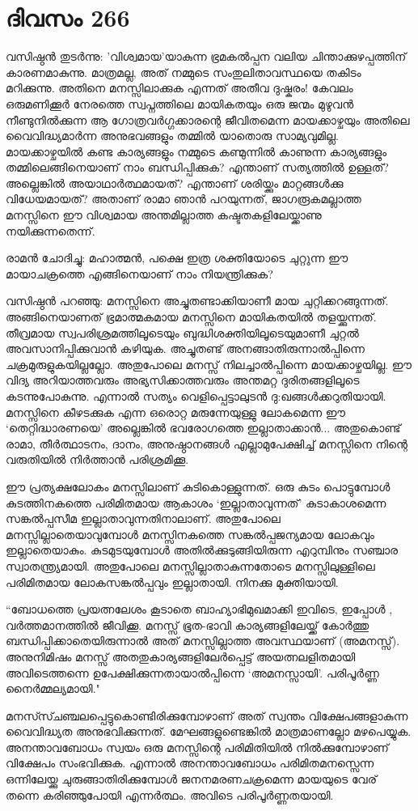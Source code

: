 \section{ദിവസം 266}


വസിഷ്ഠന്‍ തുടര്‍ന്നു: 'വിശ്വമായ'യാകുന്ന ഭ്രമകല്‍പ്പന വലിയ ചിന്താക്കുഴപ്പത്തിന് കാരണമാകുന്നു. മാത്രമല്ല, അത് നമ്മുടെ സംതുലിതാവസ്ഥയെ തകിടം മറിക്കുന്നു. അതിനെ മനസ്സിലാക്കുക എന്നത് അതീവ ദുഷ്കരം! കേവലം ഒരുമണിക്കൂര്‍ നേരത്തെ സ്വപ്നത്തിലെ മായികതയും ഒരു ജന്മം മുഴുവന്‍ നീണ്ടുനില്‍ക്കുന്ന ആ ഗോത്രവര്‍ഗ്ഗക്കാരന്റെ ജീവിതമെന്ന മായക്കാഴ്ചയും അതിലെ വൈവിദ്ധ്യമാര്‍ന്ന അനുഭവങ്ങളും തമ്മില്‍ യാതൊരു സാമ്യവുമില്ല. മായക്കാഴ്ചയില്‍ കണ്ട കാര്യങ്ങളും നമ്മുടെ കണ്മുന്നില്‍ കാണുന്ന കാര്യങ്ങളും തമ്മിലെങ്ങിനെയാണ് നാം ബന്ധിപ്പിക്കുക? എന്താണ് സത്യത്തില്‍ ഉള്ളത്? അല്ലെങ്കില്‍ അയാഥാര്‍ത്ഥമായത്? എന്താണ് ശരിയ്ക്കും  മാറ്റങ്ങള്‍ക്കു വിധേയമായത്? അതാണ്‌ രാമാ ഞാന്‍ പറയുന്നത്, ജാഗരൂകമല്ലാത്ത മനസ്സിനെ ഈ വിശ്വമായ അന്തമില്ലാത്ത കഷ്ടതകളിലേയ്ക്കാണു നയിക്കുന്നതെന്ന്.    

രാമന്‍ ചോദിച്ചു: മഹാത്മന്‍, പക്ഷെ ഇത്ര ശക്തിയോടെ ചുറ്റുന്ന ഈ മായാചക്രത്തെ എങ്ങിനെയാണ് നാം നിയന്ത്രിക്കുക?

വസിഷ്ഠന്‍ പറഞ്ഞു: മനസ്സിനെ അച്ചുതണ്ടാക്കിയാണീ മായ ചുറ്റിക്കറങ്ങുന്നത്. അങ്ങിനെയാണത് ഭ്രമാത്മകമായ മനസ്സിനെ മായികതയില്‍ തളയ്ക്കുന്നത്. തീവ്രമായ സ്വപരിശ്രമത്തിലൂടെയും ബുദ്ധിശക്തിയിലൂടെയുമാണീ ചുറ്റല്‍ അവസാനിപ്പിക്കുവാന്‍ കഴിയുക. അച്ചുതണ്ട് അനങ്ങാതിരുന്നാല്‍പ്പിന്നെ ചക്രമുരുളുകയില്ലല്ലോ. അതുപോലെ മനസ്സ് നിലച്ചാല്‍പ്പിന്നെ മായക്കാഴ്ചയില്ല. ഈ വിദ്യ അറിയാത്തവരും അഭ്യസിക്കാത്തവരും അന്തമറ്റ ദുരിതങ്ങളിലൂടെ കടന്നുപോകുന്നു. എന്നാല്‍ സത്യം വെളിപ്പെട്ടാലുടന്‍ ദു:ഖങ്ങള്‍ക്കറുതിയായി. മനസ്സിനെ കീഴടക്കുക എന്ന ഒരൊറ്റ മരുന്നേയുള്ളു ലോകമെന്ന ഈ ‘തെറ്റിദ്ധാരണയെ’ അല്ലെങ്കില്‍ ഭവരോഗത്തെ ഇല്ലാതാക്കാന്‍... അതുകൊണ്ട് രാമാ, തീര്‍ത്ഥാടനം, ദാനം, അനുഷ്ഠാനങ്ങള്‍ എല്ലാമുപേക്ഷിച്ച് മനസ്സിനെ നിന്റെ വരുതിയില്‍ നിര്‍ത്താന്‍ പരിശ്രമിക്കൂ. 

ഈ പ്രത്യക്ഷലോകം മനസ്സിലാണ് കുടികൊള്ളുന്നത്. ഒരു കുടം പൊട്ടുമ്പോള്‍ കുടത്തിനകത്തെ പരിമിതമായ ആകാശം ‘ഇല്ലാതാവുന്നത്’ കുടാകാശമെന്ന സങ്കല്‍പ്പസീമ ഇല്ലാതാവുന്നതിനാലാണ്. അതുപോലെ മനസ്സില്ലാതെയാവുമ്പോള്‍  മനസ്സിനകത്തെ സങ്കല്‍പ്പജന്യമായ ലോകവും ഇല്ലാതെയാകും. കുടമുടയുമ്പോള്‍ അതില്‍ക്കുടുങ്ങിയിരുന്ന എറുമ്പിനും സഞ്ചാര സ്വാതന്ത്ര്യമായി. അതുപോലെ മനസ്സില്ലാതാകുന്നതോടെ മനസ്സിലുള്ളിലെ പരിമിതമായ ലോകസങ്കല്‍പ്പവും ഇല്ലാതായി. നിനക്കു മുക്തിയായി.

“ബോധത്തെ പ്രയത്നലേശം കൂടാതെ ബാഹ്യാഭിമുഖമാക്കി ഇവിടെ, ഇപ്പോള്‍ , വര്‍ത്തമാനത്തില്‍ ജീവിക്കൂ. മനസ്സ് ഭൂത-ഭാവി കാര്യങ്ങളിലേയ്ക്ക് കോര്‍ത്തു ബന്ധിപ്പിക്കാതെയിരുന്നാല്‍ അത് മനസ്സില്ലാത്ത അവസ്ഥയാണ് (അമനസ്സ്). അനുനിമിഷം മനസ്സ് അതതുകാര്യങ്ങളിലേര്‍പ്പെട്ട് അയത്നലളിതമായി അവിടെത്തന്നെ ഉപേക്ഷിക്കുന്നതായാല്‍പ്പിന്നെ ‘അമനസ്സായി’. പരിപൂര്‍ണ്ണ നൈര്‍മ്മല്യമായി."    

മനസ്സ്ചഞ്ചലപ്പെട്ടുകൊണ്ടിരിക്കുമ്പോഴാണ് അത് സ്വന്തം വിക്ഷേപങ്ങളാകുന്ന വൈവിദ്ധ്യത അനുഭവിക്കുന്നത്. മേഘങ്ങളുണ്ടെങ്കില്‍ മാത്രമാണല്ലോ മഴപെയ്യുക. അനന്താവബോധം സ്വയം ഒരു മനസ്സിന്റെ പരിമിതിയില്‍ നില്‍ക്കുമ്പോഴാണ് വിക്ഷേപം സംഭവിക്കുക. എന്നാല്‍ അനന്താവബോധം പരിമിതമനസ്സെന്ന ഒന്നിലേയ്ക്കു ചുരുങ്ങാതിരിക്കുമ്പോള്‍ ജനനമരണചക്രമെന്ന മായയുടെ വേര് തന്നെ കരിഞ്ഞുപോയി എന്നര്‍ത്ഥം. അവിടെ പരിപൂര്‍ണ്ണതയായി.